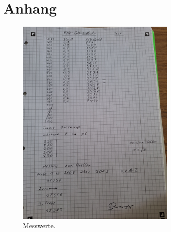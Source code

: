 \section{Anhang}
\label{sec:Anhang}

\begin{figure}[H]
    \centering
        \centering
        \includegraphics[width=0.7\textwidth]{Bilder/mw.jpg}
        \caption{Messwerte.}
    \hfill
\end{figure}